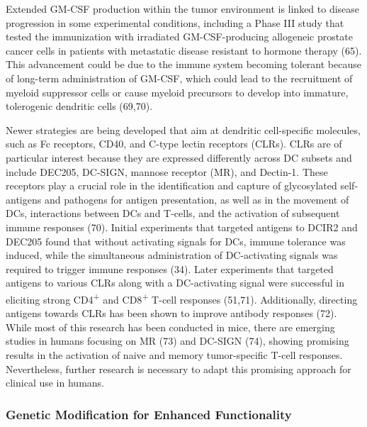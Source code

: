 \documentclass[
]{article}
\begin{document}
Extended GM-CSF production within the tumor environment is linked to
disease progression in some experimental conditions, including a Phase
III study that tested the immunization with irradiated GM-CSF-producing
allogeneic prostate cancer cells in patients with metastatic disease
resistant to hormone therapy (65). This advancement could be due to the
immune system becoming tolerant because of long-term administration of
GM-CSF, which could lead to the recruitment of myeloid suppressor cells
or cause myeloid precursors to develop into immature, tolerogenic
dendritic cells (69,70).

Newer strategies are being developed that aim at dendritic cell-specific
molecules, such as Fc receptors, CD40, and C-type lectin receptors
(CLRs). CLRs are of particular interest because they are expressed
differently across DC subsets and include DEC205, DC-SIGN, mannose
receptor (MR), and Dectin-1. These receptors play a crucial role in the
identification and capture of glycosylated self-antigens and pathogens
for antigen presentation, as well as in the movement of DCs,
interactions between DCs and T-cells, and the activation of subsequent
immune responses (70). Initial experiments that targeted antigens to
DCIR2 and DEC205 found that without activating signals for DCs, immune
tolerance was induced, while the simultaneous administration of
DC-activating signals was required to trigger immune responses (34).
Later experiments that targeted antigens to various CLRs along with a
DC-activating signal were successful in eliciting strong
CD4\textsuperscript{+} and CD8\textsuperscript{+} T-cell responses
(51,71). Additionally, directing antigens towards CLRs has been shown to
improve antibody responses (72). While most of this research has been
conducted in mice, there are emerging studies in humans focusing on MR
(73) and DC-SIGN (74), showing promising results in the activation of
naive and memory tumor-specific T-cell responses. Nevertheless, further
research is necessary to adapt this promising approach for clinical use
in humans.

\subsubsection{Genetic Modification for Enhanced
Functionality}\label{genetic-modification-for-enhanced-functionality}
\end{document}
